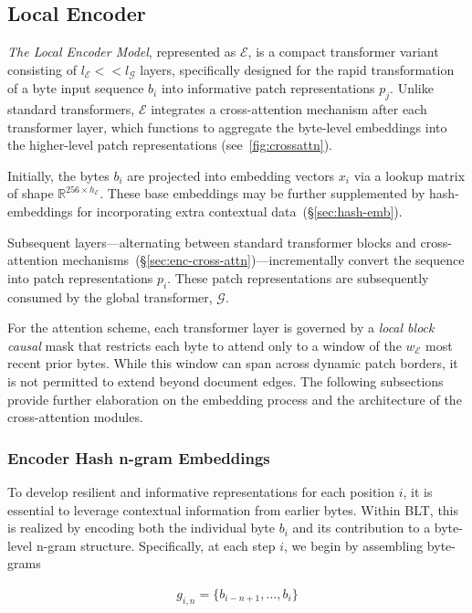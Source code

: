 \subsection{Local Encoder}
\label{section:local}

\textit{The Local Encoder Model}, represented as $\mathcal{E}$, is a compact transformer variant consisting of $l_{\mathcal{E}} << l_{\mathcal{G}}$ layers, specifically designed for the rapid transformation of a byte input sequence $b_i$ into informative patch representations $p_j$. Unlike standard transformers, $\mathcal{E}$ integrates a cross-attention mechanism after each transformer layer, which functions to aggregate the byte-level embeddings into the higher-level patch representations (see~\autoref{fig:crossattn}).

Initially, the bytes $b_i$ are projected into embedding vectors $x_i$ via a lookup matrix of shape $\mathbb{R}^{256 \times h_{\mathcal{E}}}$. These base embeddings may be further supplemented by hash-embeddings for incorporating extra contextual data~(\S\ref{sec:hash-emb}).

Subsequent layers—alternating between standard transformer blocks and cross-attention mechanisms~(\S\ref{sec:enc-cross-attn})—incrementally convert the sequence into patch representations $p_i$. These patch representations are subsequently consumed by the global transformer, $\mathcal{G}$.

For the attention scheme, each transformer layer is governed by a \textit{local block causal} mask that restricts each byte to attend only to a window of the $w_{\mathcal{E}}$ most recent prior bytes. While this window can span across dynamic patch borders, it is not permitted to extend beyond document edges. The following subsections provide further elaboration on the embedding process and the architecture of the cross-attention modules.

\subsubsection{Encoder Hash n-gram Embeddings}
\label{sec:ngram-emb}
\label{sec:hash-emb}
To develop resilient and informative representations for each position $i$, it is essential to leverage contextual information from earlier bytes. Within {\textsc BLT}, this is realized by encoding both the individual byte $b_i$ and its contribution to a byte-level n-gram structure. Specifically, at each step $i$, we begin by assembling byte-grams

\begin{align}
    g_{i,n}=\{b_{i-n + 1},\ldots, b_i\}
\end{align}


